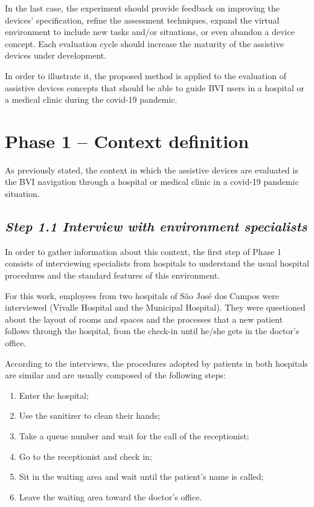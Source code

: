 In the last case, the experiment should provide feedback on improving the devices' specification, refine the assessment techniques, expand the virtual environment to include new tasks and/or situations, or even abandon a device concept. Each evaluation cycle should increase the maturity of the assistive devices under development.

In order to illustrate it, the proposed method is applied to the evaluation of assistive devices concepts that should be able to guide BVI users in a hospital or a medical clinic during the covid-19 pandemic.

\section{Phase 1 – Context definition}
\label{sec:interviews_phase}
    As previously stated, the context in which the assistive devices are evaluated is the BVI navigation through a hospital or medical clinic in a covid-19 pandemic situation. 

    \subsection*{\textit{Step 1.1 Interview with environment specialists}}
    
        In order to gather information about this context, the first step of Phase 1 consists of interviewing specialists from hospitals to understand the usual hospital procedures and the standard features of this environment.
        
        For this work, employees from two hospitals of São José dos Campos were interviewed (Vivalle Hospital and the Municipal Hospital). They were questioned about the layout of rooms and spaces and the processes that a new patient follows through the hospital, from the check-in until he/she gets in the doctor's office. 

        According to the interviews, the procedures adopted by patients in both hospitals are similar and are usually composed of the following steps:

        \begin{enumerate}
            \item Enter the hospital;
            \item Use the sanitizer to clean their hands;
            \item Take a queue number and wait for the call of the receptionist;
            \item Go to the receptionist and check in;
            \item Sit in the waiting area and wait until the patient's name is called;
            \item Leave the waiting area toward the doctor's office.            
        \end{enumerate}


